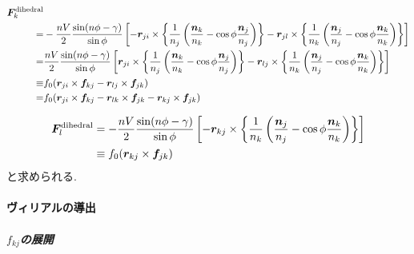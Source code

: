 \begin{align}
   \bm{F}_{k}^{\mathrm{dihedral}} &
 \notag
 \\
 =&
   -\frac{nV}{2} \frac{\sin(n\phi - \gamma)}{\sin{\phi}}
    \left[
          - \bm{r}_{ji} \times
            \left\{
            \frac{1}{n_{j}}
            \left(
                   \frac{\bm{n}_{k}}{n_{k}} - \cos\phi \frac{\bm{n}_{j}}{n_{j}}
            \right)
            \right\}
          -
            \bm{r}_{jl} \times
            \left\{
            \frac{1}{n_{k}}
            \left(
                   \frac{\bm{n}_{j}}{n_{j}} - \cos\phi \frac{\bm{n}_{k}}{n_{k}}
            \right)
            \right\}
    \right]
 \notag
 \\
 =&
    \frac{nV}{2} \frac{\sin(n\phi - \gamma)}{\sin{\phi}}
    \left[
            \bm{r}_{ji} \times
            \left\{
            \frac{1}{n_{j}}
            \left(
                   \frac{\bm{n}_{k}}{n_{k}} - \cos\phi \frac{\bm{n}_{j}}{n_{j}}
            \right)
            \right\}
          -
            \bm{r}_{lj} \times
            \left\{
            \frac{1}{n_{k}}
            \left(
                   \frac{\bm{n}_{j}}{n_{j}} - \cos\phi \frac{\bm{n}_{k}}{n_{k}}
            \right)
            \right\}
    \right]
 \notag
 \\
 \equiv&
   f_{0} (\bm{r}_{ji} \times \bm{f}_{kj} - \bm{r}_{lj} \times \bm{f}_{jk})
 \notag
 \\
 =&
   f_{0} (  \bm{r}_{ji} \times \bm{f}_{kj}
          - \bm{r}_{lk} \times \bm{f}_{jk}
          - \bm{r}_{kj} \times \bm{f}_{jk})
 \notag
\end{align}

\begin{align}
   \bm{F}_{l}^{\mathrm{dihedral}}
 &=
   -\frac{nV}{2} \frac{\sin(n\phi - \gamma)}{\sin{\phi}}
    \left[
          - \bm{r}_{kj} \times
            \left\{
            \frac{1}{n_{k}}
            \left(
                   \frac{\bm{n}_{j}}{n_{j}} - \cos\phi \frac{\bm{n}_{k}}{n_{k}}
            \right)
            \right\}
    \right]
 \notag
 \\
 &\equiv
   f_{0} (\bm{r}_{kj} \times \bm{f}_{jk})
 \notag
\end{align}
と求められる.

\paragraph{ヴィリアルの導出}
\subparagraph{$f_{kj}$の展開} \

